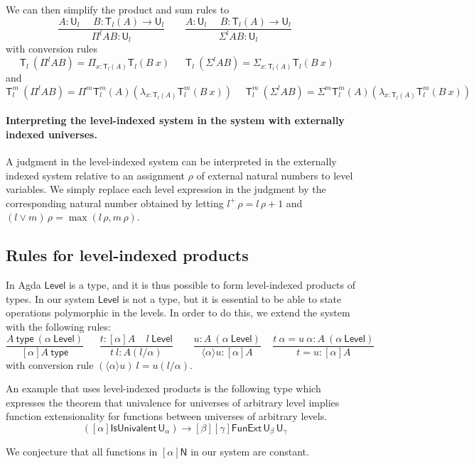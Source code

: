 \documentclass[11pt,a4paper]{article}
\theoremstyle{definition}
\newcommand{\lam}[2]{{\langle}#1{\rangle}#2}
\def\NN{\mathsf{N}}
\def\UU{\mathsf{U}}
\def\Level{\mathsf{Level}}
\newcommand{\type}{\mathsf{type}}
\newcommand{\mypi}[3]{\Pi_{#1:#2}#3}
\newcommand{\mylam}[3]{\lambda_{#1:#2}#3}
\newcommand{\mysig}[3]{\Sigma_{#1:#2}#3}
\newcommand{\T}{\mathsf{T}}
\begin{document}
We can then simplify the product and sum rules to
$$
\frac{A:\UU_{l}~~~~~~B:\T_{l}(A)\rightarrow \UU_{l}}
     {\Pi^{l} A B:\UU_{l}}~~~~~~~~~
\frac{A:\UU_{l}~~~~~~B:\T_{l}(A)\rightarrow \UU_{l}}
     {\Sigma^{l} A B:\UU_{l}}~~~~~~~~~
$$
with conversion rules
$$
\T_{l}~(\Pi^{l} A B) = \mypi{x}{\T_{l}(A)}{ \T_{l}(B~x)}~~~~~~~
\T_{l}~(\Sigma^{l} A B) =  \mysig{x}{\T_{l}(A)}{ \T_{l}(B~x)}~~~~~~~
$$
and
$$
\T_{l}^{m}~(\Pi^{l} A B) = \Pi^{m} \T_{l}^{m}(A) (\mylam {x}{\T_{l}(A)}{\T_{l}^{m}(B~x)})~~~~~~
\T_{l}^{m}~(\Sigma^{l} A B) = \Sigma^{m} \T_{l}^{m}(A) (\mylam {x}{\T_{l}(A)}{\T_{l}^{m}(B~x)})~~~~~~
$$


\paragraph{Interpreting the level-indexed system in the system with externally indexed universes.}

A judgment in the level-indexed system can be interpreted in the externally indexed system relative to an assignment $\rho$ of external natural numbers to level variables. We simply replace each level expression in the judgment by the corresponding natural number obtained by letting $l^+\,\rho = l\,\rho+1$ and $(l \vee m)\,\rho = \max(l\,\rho,m\,\rho)$.

\subsection*{Rules for level-indexed products}

In Agda $\Level$ is a type,
and it is thus possible to form level-indexed products of types.
In our system $\Level$ is not a type, but it is essential to be able to state operations polymorphic
in the levels. In order to do this, we extend the system with the following rules:
$$
\frac{A~\type~(\alpha~\Level)}{[\alpha]A~\type}~~~~~~~
\frac{t:[\alpha]A~~~~~l~\Level}
     {t~l:A(l/\alpha)}~~~~~~~~~
\frac{u:A~(\alpha~\Level)}{\lam{\alpha}{u}: [\alpha]A}~~~~~
\frac{t~\alpha = u~\alpha:A~(\alpha~\Level)}{t = u:[\alpha]A}
$$
with conversion rule $(\lam{\alpha}{u})~l = u(l/\alpha)$.

An example that uses level-indexed products is the following type which  expresses the theorem that univalence for universes of arbitrary level implies function extensionality for functions between universes of arbitrary levels.
$$
([\alpha]\mathsf{IsUnivalent}\, \UU_\alpha)
\to [\beta][\gamma] \mathsf{FunExt}\, \UU_\beta\, \UU_\gamma
$$

We conjecture that all functions in $[\alpha]\NN$ in our system
are constant.
\end{document}
